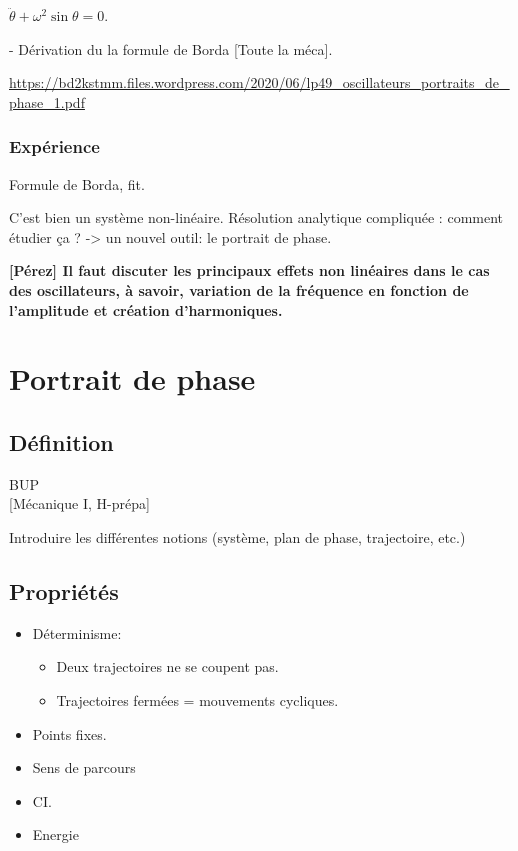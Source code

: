 \documentclass[11pt]{report}
\numberwithin{figure}{section}
\numberwithin{equation}{section}
\numberwithin{table}{section}
\newcommand{\1}{\boldsymbol{1}}
\begin{document}
$\ddot{\theta} + \omega^2 \sin \theta = 0$.

- Dérivation du la formule de Borda [Toute la méca].

\url{https://bd2kstmm.files.wordpress.com/2020/06/lp49_oscillateurs_portraits_de_phase_1.pdf}

\subsubsection{Expérience} Formule de Borda, fit.


C'est bien un système non-linéaire. Résolution analytique compliquée : comment étudier ça ? -> un nouvel outil: le portrait de phase. 

\textbf{[Pérez] Il faut discuter les principaux effets non linéaires dans le cas des oscillateurs, à savoir, variation de la fréquence en fonction de l'amplitude et création d'harmoniques.}

\section{Portrait de phase}

\subsection{Définition}

\textcolor{mycolor5}{BUP} \\
\textcolor{mycolor5}{[Mécanique I, H-prépa]}

Introduire les différentes notions (système, plan de phase, trajectoire,  etc.)

\subsection{Propriétés}

\begin{itemize}
\item Déterminisme: 
	\begin{itemize}
	\item Deux trajectoires ne se coupent pas. 
	\item Trajectoires fermées = mouvements cycliques.
	\end{itemize}
\item Points fixes.
\item Sens de parcours
\item CI.
\item Energie
\end{itemize}
\end{document}
